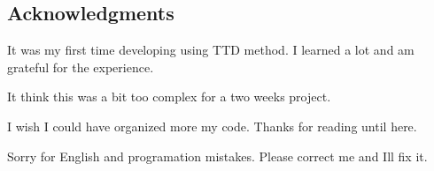 \subsection*{Acknowledgments}


\begin{DoxyItemize}
\item It was my first time developing using T\+TD method. I learned a lot and am grateful for the experience.
\item It think this was a bit too complex for a two weeks project.
\item I wish I could have organized more my code. Thanks for reading until here.
\item Sorry for English and programation mistakes. Please correct me and I\textquotesingle{}ll fix it. 
\end{DoxyItemize}
